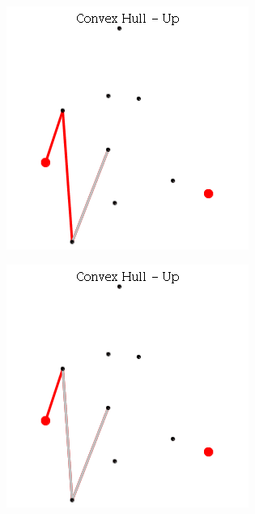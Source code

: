 \documentclass[12pt]{article}
\begin{document}
\begin{figure}[h]
\begin{subfigure}[h]{0.3\linewidth}
              \caption{}
            \end{subfigure}
            \begin{subfigure}[h]{0.3\linewidth}
              \includegraphics[width=\linewidth]{GIF/Up-4}
              \caption{}
            \end{subfigure}
            \begin{subfigure}[h]{0.3\linewidth}
              \includegraphics[width=\linewidth]{GIF/Up-5}

\end{subfigure}
\end{figure}
\end{document}
